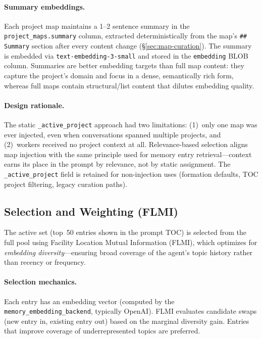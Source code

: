 \documentclass[11pt,a4paper]{article}
\newcommand{\code}[1]{\texttt{#1}}
\begin{document}
\paragraph{Summary embeddings.}
Each project map maintains a 1--2 sentence summary in the
\code{project\_maps.summary} column, extracted deterministically from
the map's \code{\#\# Summary} section after every content change
(\S\ref{sec:map-curation}). The summary is embedded via
\code{text-embedding-3-small} and stored in the \code{embedding} BLOB
column.
Summaries are better embedding targets than full map content: they
capture the project's domain and focus in a dense, semantically rich
form, whereas full maps contain structural/list content that dilutes
embedding quality.

\paragraph{Design rationale.}
The static \code{\_active\_project} approach had two limitations:
(1)~only one map was ever injected, even when conversations spanned
multiple projects, and (2)~workers received no project context at all.
Relevance-based selection aligns map injection with the same principle
used for memory entry retrieval---context earns its place in the prompt
by relevance, not by static assignment. The \code{\_active\_project}
field is retained for non-injection uses (formation defaults, TOC
project filtering, legacy curation paths).

\subsection{Selection and Weighting (FLMI)}

The active set (top~50 entries shown in the prompt TOC) is selected from
the full pool using Facility Location Mutual Information (FLMI), which
optimizes for \emph{embedding diversity}---ensuring broad coverage of
the agent's topic history rather than recency or frequency.

\paragraph{Selection mechanics.}
Each entry has an embedding vector (computed by the
\code{memory\_embedding\_backend}, typically OpenAI). FLMI evaluates
candidate swaps (new entry in, existing entry out) based on the
marginal diversity gain. Entries that improve coverage of
underrepresented topics are preferred.
\end{document}
